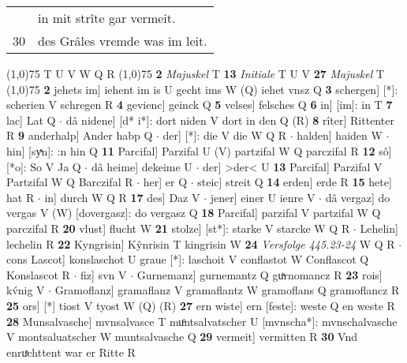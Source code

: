 \documentclass[8pt,a4paper,notitlepage]{article}
\begin{document}
\begin{table}[ht]
\begin{minipage}[t]{0.5\linewidth}
\begin{tabular}{rl}
 & in mit strîte gar vermeit.\\ 
30 & des Grâles vremde was im leit.\\ 
\end{tabular}
\scriptsize
\line(1,0){75} \newline
T U V W Q R \newline
\line(1,0){75} \newline
\textbf{2} \textit{Majuskel} T  \textbf{13} \textit{Initiale} T U V  \textbf{27} \textit{Majuskel} T  \newline
\line(1,0){75} \newline
\textbf{2} jehets im] iehent im is U gecht ims W (Q) iehet vnsz Q \textbf{3} schergen] [*]: scherien V schregen R \textbf{4} gevienc] geinck Q \textbf{5} velses] felsches Q \textbf{6} in] [im]: in T \textbf{7} lac] Lat Q  $\cdot$ dâ nidene] [d* i*]: dort niden V dort in den Q (R) \textbf{8} rîter] Rittenter R \textbf{9} anderhalp] Ander habp Q  $\cdot$ der] [*]: die V die W Q R  $\cdot$ halden] haiden W  $\cdot$ hin] [syͯn]: :n hin Q \textbf{11} Parcifal] Parzifal U (V) partzifal W Q parczifal R \textbf{12} sô] [*o]: So V Ja Q  $\cdot$ dâ heime] dekeime U  $\cdot$ der] >der< U \textbf{13} Parcifal] Parzifal V Partzifal W Q Barczifal R  $\cdot$ her] er Q  $\cdot$ steic] streit Q \textbf{14} erden] erde R \textbf{15} hete] hat R  $\cdot$ in] durch W Q R \textbf{17} des] Daz V  $\cdot$ jener] einer U ienre V  $\cdot$ dâ vergaz] do vergas V (W) [dovergasz]: do vergasz  Q \textbf{18} Parcifal] parzifal V partzifal W Q parczifal R \textbf{20} vlust] flucht W \textbf{21} stolze] [st*]: starke V starcke W Q R  $\cdot$ Lehelin] lechelin R \textbf{22} Kyngrisin] Kŷnrisin T kingrisin W \textbf{24} \textit{Versfolge 445.23-24} W Q R   $\cdot$ cons Lascot] konslaschot U graue [*]: laschoit V conflastot W Conflascot Q Konslascot R  $\cdot$ fiz] svn V  $\cdot$ Gurnemanz] gurnemantz Q guͯrnomancz R \textbf{23} rois] kv́nig V  $\cdot$ Gramoflanz] gramaflanz V gramaflantz W gramoflans Q gramoflancz R \textbf{25} ors] [*] tiost V tyost W (Q) (R) \textbf{27} ern wiste] ern [feste]: weste Q en weste R \textbf{28} Munsalvasche] mvnsalvasce T muͦntsalvatscher U [mvnscha*]: mvnschalvasche V montsaluatscher W muntsalvasche Q \textbf{29} vermeit] vermitten R \textbf{30} Vnd enruͯchttent war er Ritte R \newline
\end{minipage}
\end{table}
\end{document}
